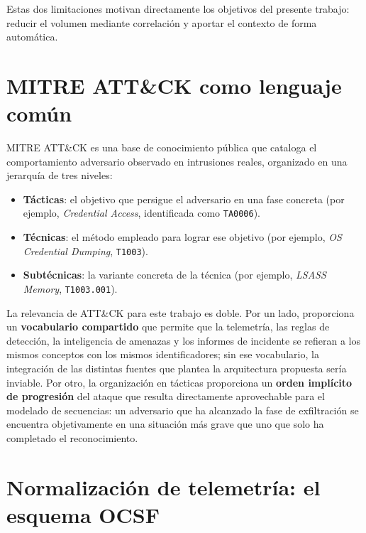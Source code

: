 Estas dos limitaciones motivan directamente los objetivos del presente trabajo: reducir el
volumen mediante correlación y aportar el contexto de forma automática.


\section{MITRE ATT\&CK como lenguaje común}
\label{sec:attack}

MITRE ATT\&CK \cite{mitre_attack} es una base de conocimiento pública que cataloga el
comportamiento adversario observado en intrusiones reales, organizado en una jerarquía de
tres niveles:

\begin{itemize}
    \item \textbf{Tácticas}: el objetivo que persigue el adversario en una fase concreta
    (por ejemplo, \textit{Credential Access}, identificada como \texttt{TA0006}).
    \item \textbf{Técnicas}: el método empleado para lograr ese objetivo (por ejemplo,
    \textit{OS Credential Dumping}, \texttt{T1003}).
    \item \textbf{Subtécnicas}: la variante concreta de la técnica (por ejemplo,
    \textit{LSASS Memory}, \texttt{T1003.001}).
\end{itemize}

La relevancia de ATT\&CK para este trabajo es doble. Por un lado, proporciona un
\textbf{vocabulario compartido} que permite que la telemetría, las reglas de detección, la
inteligencia de amenazas y los informes de incidente se refieran a los mismos conceptos con
los mismos identificadores; sin ese vocabulario, la integración de las distintas fuentes que
plantea la arquitectura propuesta sería inviable. Por otro, la organización en tácticas
proporciona un \textbf{orden implícito de progresión} del ataque que resulta directamente
aprovechable para el modelado de secuencias: un adversario que ha alcanzado la fase de
exfiltración se encuentra objetivamente en una situación más grave que uno que solo ha
completado el reconocimiento.

\section{Normalización de telemetría: el esquema OCSF}
\label{sec:ocsf}

